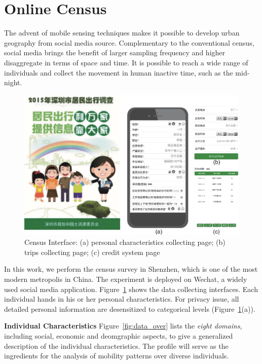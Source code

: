 \section{Online Census}

The advent of mobile sensing techniques makes it possible to develop urban geography from social media source. Complementary to the conventional census, social media brings the benefit of larger sampling frequency and higher disaggregate in terms of space and time. It is possible to reach a wide range of individuals and collect the movement in human inactive time, such as the mid-night.


\begin{figure}[htb!]
 \centering %
 \includegraphics[width=\columnwidth]{pictures/survey_app}
 \caption{Census Interface: (a) personal characteristics collecting page; (b) trips collecting page; (c) credit system page}
 \label{fig:app}
\end{figure}

In this work, we perform the census survey in Shenzhen, which is one of the most modern metropolis in China. The experiment is deployed on Wechat, a widely used social media application. Figure~\ref{fig:app} shows the data collecting interfaces. Each individual hands in his or her personal characteristics. For privacy issue, all detailed personal information are desensitized to categorical levels (Figure~\ref{fig:app}(a)). 


\textbf{Individual Characteristics} Figure~\ref{fig:data_over} lists the \textit{eight domains}, including social, economic and deomgraphic aspects, to give a generalized description of the individual characteristics. The profile will serve as the ingredients for the analysis of mobility patterns over diverse individuals. 


